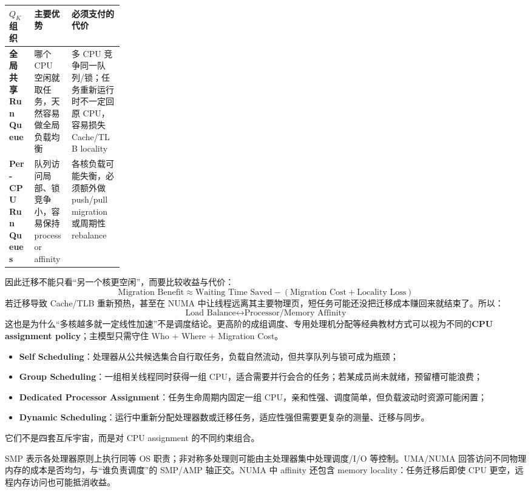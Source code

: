 \documentclass[11pt,a4paper]{ctexart}
\newcommand{\kw}[1]{\textbf{#1}}
\begin{document}
\begingroup
\small
\renewcommand{\arraystretch}{1.22}
\setlength{\tabcolsep}{5pt}
\begin{tabularx}{\linewidth}{>{\bfseries}p{0.22\linewidth} X X}
\toprule
$Q_K$ 组织 & 主要优势 & 必须支付的代价\\
\midrule
全局共享 Run Queue & 哪个 CPU 空闲就取任务，天然容易做全局负载均衡 & 多 CPU 竞争同一队列/锁；任务重新运行时不一定回原 CPU，容易损失 Cache/TLB locality\\
Per-CPU Run Queues & 队列访问局部、锁竞争小，容易保持 processor affinity & 各核负载可能失衡，必须额外做 push/pull migration 或周期性 rebalance\\
\bottomrule
\end{tabularx}
\endgroup

因此迁移不能只看“另一个核更空闲”，而要比较收益与代价：
\[
\boxed{
\text{Migration Benefit}
\approx
\text{Waiting Time Saved}
-
(\text{Migration Cost}+\text{Locality Loss})
}
\]
若迁移导致 Cache/TLB 重新预热，甚至在 NUMA 中让线程远离其主要物理页，短任务可能还没把迁移成本赚回来就结束了。所以：
\[
\boxed{\text{Load Balance}\leftrightarrow\text{Processor/Memory Affinity}}
\]
这也是为什么“多核越多就一定线性加速”不是调度结论。更高阶的成组调度、专用处理机分配等经典教材方式可以视为不同的\kw{CPU assignment policy}；主模型只需守住 Who + Where + Migration Cost。

\begin{method}
\begin{itemize}
\item \kw{Self Scheduling}：处理器从公共候选集合自行取任务，负载自然流动，但共享队列与锁可成为瓶颈；
\item \kw{Group Scheduling}：一组相关线程同时获得一组 CPU，适合需要并行会合的任务；若某成员尚未就绪，预留槽可能浪费；
\item \kw{Dedicated Processor Assignment}：任务生命周期内固定一组 CPU，亲和性强、调度简单，但负载波动时资源可能闲置；
\item \kw{Dynamic Scheduling}：运行中重新分配处理器数或迁移任务，适应性强但需要更复杂的测量、迁移与同步。
\end{itemize}
它们不是四套互斥宇宙，而是对 CPU assignment 的不同约束组合。
\end{method}

SMP 表示各处理器原则上执行同等 OS 职责；非对称多处理则可能由主处理器集中处理调度/I/O 等控制。UMA/NUMA 回答访问不同物理内存的成本是否均匀，与“谁负责调度”的 SMP/AMP 轴正交。NUMA 中 affinity 还包含 memory locality：任务迁移后即使 CPU 更空，远程内存访问也可能抵消收益。
\end{document}
